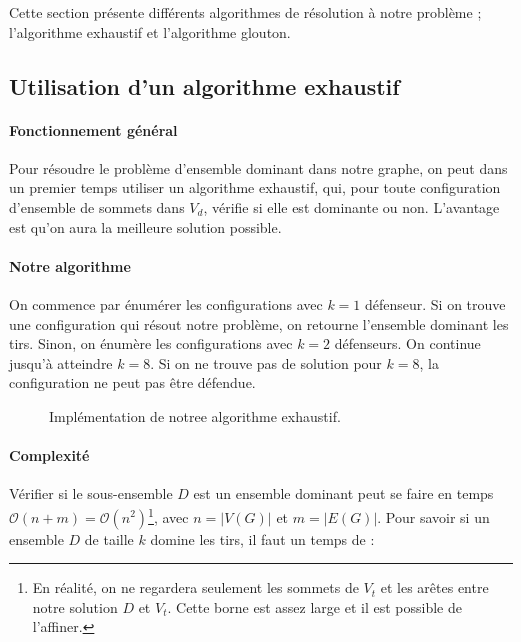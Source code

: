 \documentclass[12pt]{article}
\begin{document}
Cette section présente différents algorithmes de résolution à notre problème ; l'algorithme exhaustif et l'algorithme glouton.


\subsection{Utilisation d'un algorithme exhaustif}

\paragraph{Fonctionnement général}
Pour résoudre le problème d'ensemble dominant dans notre graphe, on peut dans un premier temps utiliser un algorithme exhaustif, qui, pour toute configuration d'ensemble de sommets dans $V_d$, vérifie si elle est dominante ou non. L'avantage est qu'on aura la meilleure solution possible.

\paragraph{Notre algorithme}
On commence par énumérer les configurations avec $k=1$ défenseur. Si on trouve une configuration qui résout notre problème, on retourne l'ensemble dominant les tirs. Sinon, on énumère  les configurations avec $k=2$ défenseurs. On continue jusqu'à atteindre $k=8$. Si on ne trouve pas de solution pour $k = 8$, la configuration ne peut pas être défendue.

\begin{figure}[h!]
  \begin{algorithm}[H]
    \BlankLine
  \end{algorithm}
  \caption{Implémentation de notree algorithme exhaustif.}
\end{figure}

\newpage

\paragraph{Complexité} Vérifier si le sous-ensemble $D$ est un ensemble dominant peut se faire en temps $\mathcal{O}(n+m) = \mathcal{O}(n^2)$\footnote{En réalité, on ne regardera seulement les sommets de $V_t$ et les arêtes entre notre solution $D$ et $V_t$. Cette borne est assez large et il est possible de l'affiner.}, avec $n = |V(G)|$ et $m = |E(G)|$. Pour savoir si un ensemble $D$ de taille $k$ domine les tirs, il faut un temps de :
\end{document}
